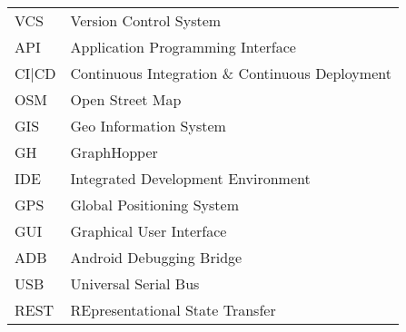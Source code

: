 \begin{singlespace}
\begin{flushleft}
\begin{longtable}{p{2 cm}p{14 cm}}
  VCS & Version Control System \\
  API & Application Programming Interface \\
  CI|CD & Continuous Integration \& Continuous Deployment \\
  OSM & Open Street Map \\
  GIS & Geo Information System \\
  GH & GraphHopper \\
  IDE & Integrated Development Environment \\
  GPS & Global Positioning System \\
  GUI & Graphical User Interface \\	
  ADB & Android Debugging Bridge \\
  USB & Universal Serial Bus \\
  REST & REpresentational State Transfer
\end{longtable}
\end{flushleft}
\end{singlespace}